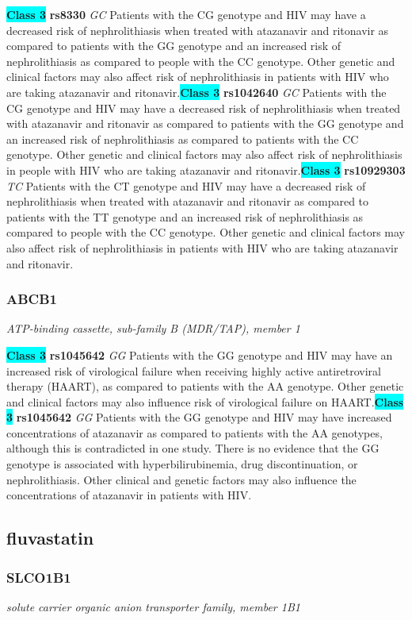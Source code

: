 \documentclass{report}
\begin{document}
\textbf{\colorbox{cyan} {Class 3}} \textbf{ rs8330 } \textit{ GC }
Patients with the CG genotype and HIV may have a decreased risk of nephrolithiasis when treated with atazanavir and ritonavir as compared to patients with the GG genotype and an increased risk of nephrolithiasis as compared to people with the CC genotype. Other genetic and clinical factors may also affect risk of nephrolithiasis in patients with HIV who are taking atazanavir and ritonavir.\newline\textbf{\colorbox{cyan} {Class 3}} \textbf{ rs1042640 } \textit{ GC }
Patients with the CG genotype and HIV may have a decreased risk of nephrolithiasis when treated with atazanavir and ritonavir as compared to patients with the GG genotype and an increased risk of nephrolithiasis as compared to patients with the CC genotype. Other genetic and clinical factors may also affect risk of nephrolithiasis in people with HIV who are taking atazanavir and ritonavir.\newline\textbf{\colorbox{cyan} {Class 3}} \textbf{ rs10929303 } \textit{ TC }
Patients with the CT genotype and HIV may have a decreased risk of nephrolithiasis when treated with atazanavir and ritonavir as compared to patients with the TT genotype and an increased risk of nephrolithiasis as compared to people with the CC genotype. Other genetic and clinical factors may also affect risk of nephrolithiasis in patients with HIV who are taking atazanavir and ritonavir. \newline\subsubsection{ ABCB1 }
\textit{ ATP-binding cassette, sub-family B (MDR/TAP), member 1 }

\textbf{\colorbox{cyan} {Class 3}} \textbf{ rs1045642 } \textit{ GG }
Patients with the GG genotype and HIV may have an increased risk of virological failure when receiving highly active antiretroviral therapy (HAART), as compared to patients with the AA genotype. Other genetic and clinical factors may also influence risk of virological failure on HAART.\newline\textbf{\colorbox{cyan} {Class 3}} \textbf{ rs1045642 } \textit{ GG }
Patients with the GG genotype and HIV may have increased concentrations of atazanavir as compared to patients with the AA genotypes, although this is contradicted in one study. There is no evidence that the GG genotype is associated with hyperbilirubinemia, drug discontinuation, or nephrolithiasis.  Other clinical and genetic factors may also influence the concentrations of atazanavir in patients with HIV. \newline\subsection{ fluvastatin }\subsubsection{ SLCO1B1 }
\textit{ solute carrier organic anion transporter family, member 1B1 }
\end{document}

